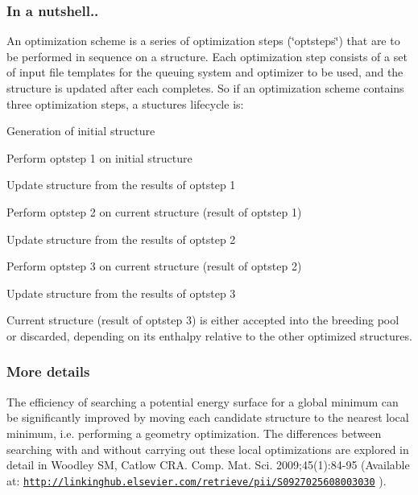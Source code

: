 \hypertarget{optschemes_quick-over}{}\subsubsection{In a nutshell..}\label{optschemes_quick-over}
An optimization scheme is a series of optimization steps (\char`\"{}optsteps\char`\"{}) that are to be performed in sequence on a structure. Each optimization step consists of a set of input file templates for the queuing system and optimizer to be used, and the structure is updated after each completes. So if an optimization scheme contains three optimization steps, a stucture\textquotesingle{}s lifecycle is\+:


\begin{DoxyEnumerate}
\item Generation of initial structure
\item Perform optstep 1 on initial structure
\item Update structure from the results of optstep 1
\item Perform optstep 2 on current structure (result of optstep 1)
\item Update structure from the results of optstep 2
\item Perform optstep 3 on current structure (result of optstep 2)
\item Update structure from the results of optstep 3
\item Current structure (result of optstep 3) is either accepted into the breeding pool or discarded, depending on its enthalpy relative to the other optimized structures.
\end{DoxyEnumerate}\hypertarget{optschemes_detailed-over}{}\subsubsection{More details}\label{optschemes_detailed-over}
The efficiency of searching a potential energy surface for a global minimum can be significantly improved by moving each candidate structure to the nearest local minimum, i.\+e. performing a geometry optimization. The differences between searching with and without carrying out these local optimizations are explored in detail in Woodley S\+M, Catlow C\+R\+A. Comp. Mat. Sci. 2009;45(1)\+:84-\/95 (Available at\+: \href{http://linkinghub.elsevier.com/retrieve/pii/S0927025608003030}{\tt http\+://linkinghub.\+elsevier.\+com/retrieve/pii/\+S0927025608003030} ).

